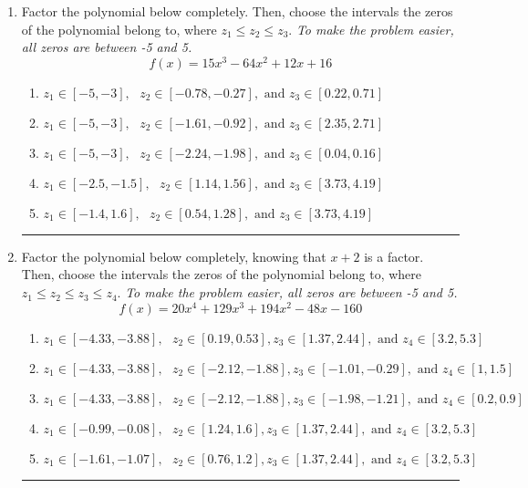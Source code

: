 \documentclass[14pt]{extbook}
\newcommand{\litem}[1]{\item#1\hspace*{-1cm}\rule{\textwidth}{0.4pt}}
\begin{document}
\begin{enumerate}
{\begin{enumerate}[label=\Alph*.]
\end{enumerate} }
\litem{
Factor the polynomial below completely. Then, choose the intervals the zeros of the polynomial belong to, where $z_1 \leq z_2 \leq z_3$. \textit{To make the problem easier, all zeros are between -5 and 5.}\[ f(x) = 15x^{3} -64 x^{2} +12 x + 16 \]\begin{enumerate}[label=\Alph*.]
\item \( z_1 \in [-5, -3], \text{   }  z_2 \in [-0.78, -0.27], \text{   and   } z_3 \in [0.22, 0.71] \)
\item \( z_1 \in [-5, -3], \text{   }  z_2 \in [-1.61, -0.92], \text{   and   } z_3 \in [2.35, 2.71] \)
\item \( z_1 \in [-5, -3], \text{   }  z_2 \in [-2.24, -1.98], \text{   and   } z_3 \in [0.04, 0.16] \)
\item \( z_1 \in [-2.5, -1.5], \text{   }  z_2 \in [1.14, 1.56], \text{   and   } z_3 \in [3.73, 4.19] \)
\item \( z_1 \in [-1.4, 1.6], \text{   }  z_2 \in [0.54, 1.28], \text{   and   } z_3 \in [3.73, 4.19] \)

\end{enumerate} }
\litem{
Factor the polynomial below completely, knowing that $x+2$ is a factor. Then, choose the intervals the zeros of the polynomial belong to, where $z_1 \leq z_2 \leq z_3 \leq z_4$. \textit{To make the problem easier, all zeros are between -5 and 5.}\[ f(x) = 20x^{4} +129 x^{3} +194 x^{2} -48 x -160 \]\begin{enumerate}[label=\Alph*.]
\item \( z_1 \in [-4.33, -3.88], \text{   }  z_2 \in [0.19, 0.53], z_3 \in [1.37, 2.44], \text{   and   } z_4 \in [3.2, 5.3] \)
\item \( z_1 \in [-4.33, -3.88], \text{   }  z_2 \in [-2.12, -1.88], z_3 \in [-1.01, -0.29], \text{   and   } z_4 \in [1, 1.5] \)
\item \( z_1 \in [-4.33, -3.88], \text{   }  z_2 \in [-2.12, -1.88], z_3 \in [-1.98, -1.21], \text{   and   } z_4 \in [0.2, 0.9] \)
\item \( z_1 \in [-0.99, -0.08], \text{   }  z_2 \in [1.24, 1.6], z_3 \in [1.37, 2.44], \text{   and   } z_4 \in [3.2, 5.3] \)
\item \( z_1 \in [-1.61, -1.07], \text{   }  z_2 \in [0.76, 1.2], z_3 \in [1.37, 2.44], \text{   and   } z_4 \in [3.2, 5.3] \)

\end{enumerate} }
\end{enumerate}
\end{document}
